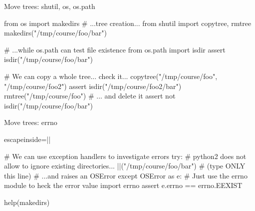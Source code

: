 \begin{pyframe}{Move trees: shutil, os, os.path}
\begin{pycode}
from os import makedirs     # ...tree creation...
from shutil import copytree, rmtree 
makedirs("/tmp/course/foo/bar")

# ...while os.path can test file existence
from os.path import isdir            
assert isdir("/tmp/course/foo/bar")

# We can copy a whole tree... check it...
copytree("/tmp/course/foo", "/tmp/course/foo2") 
assert isdir("/tmp/course/foo2/bar")            
rmtree("/tmp/course/foo") # ... and delete it
assert not isdir("/tmp/course/foo/bar")
\end{pycode}
\end{pyframe}

\begin{pyframe}{Move trees: errno}
\begin{pycode*}{escapeinside=||}

# We can use exception handlers to investigate errors
try:
    # python2 does not allow to ignore existing directories...
    ||("/tmp/course/foo/bar") # (type ONLY this line)
    #  ...and raises an OSError
except OSError as e:
    # Just use the errno module to heck the error value
    import errno
    assert e.errno == errno.EEXIST
    
help(makedirs)
\end{pycode*}
\end{pyframe}

